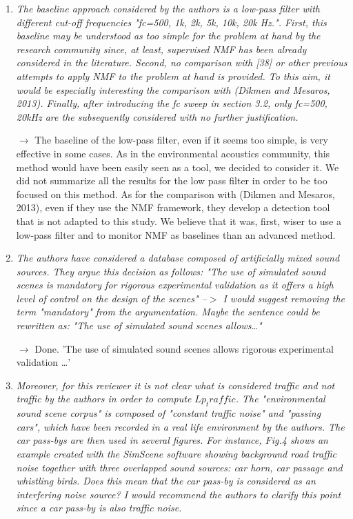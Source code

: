 \documentclass[10pt]{article}
\begin{document}
\begin{enumerate}
\item \emph{The baseline approach considered by the authors is a low-pass filter with different cut-off frequencies "fc={500, 1k, 2k, 5k, 10k, 20k} Hz.". First, this baseline may be understood as too simple for the problem at hand by the research community since, at least, supervised NMF has been already considered in the literature. Second, no comparison with [38] or other previous attempts to apply NMF to the problem at hand is provided. To this aim, it would be especially interesting the comparison with (Dikmen and Mesaros, 2013). Finally, after introducing the fc sweep in section 3.2, only fc={500, 20k}Hz are the subsequently considered with no further justification.}

$\rightarrow$ The baseline of the low-pass filter, even if it seems too simple, is very effective in some cases. As in the environmental acoustics community, this method would have been easily seen as a tool, we decided to consider it. We did not summarize all the results for the low pass filter in order to be too focused on this method.
As for the comparison with (Dikmen and Mesaros, 2013), even if they use the NMF framework, they develop a detection tool that is not adapted to this study. We believe that it was, first, wiser to use a low-pass filter and to monitor NMF as baselines than an advanced method.

\item \emph{The authors have considered a database composed of artificially mixed sound sources. They argue this decision as follows: "The use of simulated sound scenes is mandatory for rigorous experimental validation as it offers a high level of control on the design of the scenes" --$>$ I would suggest removing the term "mandatory" from the argumentation. Maybe the sentence could be rewritten as: "The use of simulated sound scenes allows…" }

$\rightarrow$ Done. 'The use of simulated sound scenes allows rigorous experimental validation \dots'


\item \emph{Moreover, for this reviewer it is not clear what is considered traffic and not traffic by the authors in order to compute $Lp_traffic$. The "environmental sound scene corpus" is composed of "constant traffic noise" and "passing cars", which have been recorded in a real life environment by the authors. The car pass-bys are then used in several figures. For instance, Fig.4 shows an example created with the SimScene software showing background road traffic noise together with three overlapped sound sources: car horn, car passage and whistling birds. Does this mean that the car pass-by is considered as an interfering noise source? I would recommend the authors to clarify this point since a car pass-by is also traffic noise.}


\end{enumerate}
\end{document}
